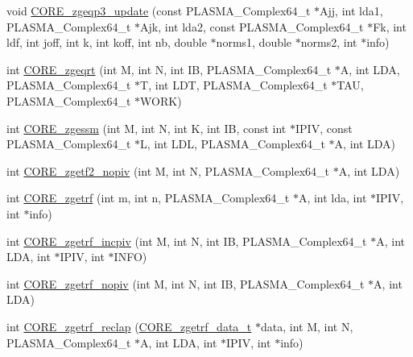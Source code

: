 \begin{DoxyCompactItemize}
\item 
void \hyperlink{group__CORE__PLASMA__Complex64__t_ga5197a279c21dd3b768492044d36b2e28_ga5197a279c21dd3b768492044d36b2e28}{C\+O\+R\+E\+\_\+zgeqp3\+\_\+update} (const P\+L\+A\+S\+M\+A\+\_\+\+Complex64\+\_\+t $\ast$Ajj, int lda1, P\+L\+A\+S\+M\+A\+\_\+\+Complex64\+\_\+t $\ast$Ajk, int lda2, const P\+L\+A\+S\+M\+A\+\_\+\+Complex64\+\_\+t $\ast$Fk, int ldf, int joff, int k, int koff, int nb, double $\ast$norms1, double $\ast$norms2, int $\ast$info)
\item 
int \hyperlink{group__CORE__PLASMA__Complex64__t_gabdb92c23fa49a35258256a0654de96fe_gabdb92c23fa49a35258256a0654de96fe}{C\+O\+R\+E\+\_\+zgeqrt} (int M, int N, int I\+B, P\+L\+A\+S\+M\+A\+\_\+\+Complex64\+\_\+t $\ast$A, int L\+D\+A, P\+L\+A\+S\+M\+A\+\_\+\+Complex64\+\_\+t $\ast$T, int L\+D\+T, P\+L\+A\+S\+M\+A\+\_\+\+Complex64\+\_\+t $\ast$T\+A\+U, P\+L\+A\+S\+M\+A\+\_\+\+Complex64\+\_\+t $\ast$W\+O\+R\+K)
\item 
int \hyperlink{group__CORE__PLASMA__Complex64__t_ga4d0ea0e6c652c958bbcd611f36b75d2e_ga4d0ea0e6c652c958bbcd611f36b75d2e}{C\+O\+R\+E\+\_\+zgessm} (int M, int N, int K, int I\+B, const int $\ast$I\+P\+I\+V, const P\+L\+A\+S\+M\+A\+\_\+\+Complex64\+\_\+t $\ast$L, int L\+D\+L, P\+L\+A\+S\+M\+A\+\_\+\+Complex64\+\_\+t $\ast$A, int L\+D\+A)
\item 
int \hyperlink{group__CORE__PLASMA__Complex64__t_ga18e3275c5c724058bcf9fe42a6cd4cfc_ga18e3275c5c724058bcf9fe42a6cd4cfc}{C\+O\+R\+E\+\_\+zgetf2\+\_\+nopiv} (int M, int N, P\+L\+A\+S\+M\+A\+\_\+\+Complex64\+\_\+t $\ast$A, int L\+D\+A)
\item 
int \hyperlink{group__CORE__PLASMA__Complex64__t_ga2478e7d46e465c84bad521f2d00b59ab_ga2478e7d46e465c84bad521f2d00b59ab}{C\+O\+R\+E\+\_\+zgetrf} (int m, int n, P\+L\+A\+S\+M\+A\+\_\+\+Complex64\+\_\+t $\ast$A, int lda, int $\ast$I\+P\+I\+V, int $\ast$info)
\item 
int \hyperlink{group__CORE__PLASMA__Complex64__t_ga2136efb038ced2ddef9251a2754612f1_ga2136efb038ced2ddef9251a2754612f1}{C\+O\+R\+E\+\_\+zgetrf\+\_\+incpiv} (int M, int N, int I\+B, P\+L\+A\+S\+M\+A\+\_\+\+Complex64\+\_\+t $\ast$A, int L\+D\+A, int $\ast$I\+P\+I\+V, int $\ast$I\+N\+F\+O)
\item 
int \hyperlink{group__CORE__PLASMA__Complex64__t_ga916150f80f14fe184b0f743c0910af80_ga916150f80f14fe184b0f743c0910af80}{C\+O\+R\+E\+\_\+zgetrf\+\_\+nopiv} (int M, int N, int I\+B, P\+L\+A\+S\+M\+A\+\_\+\+Complex64\+\_\+t $\ast$A, int L\+D\+A)
\item 
int \hyperlink{group__CORE__PLASMA__Complex64__t_ga9bfcefdb7d77fa9b55ce65fdc6ce9d8b_ga9bfcefdb7d77fa9b55ce65fdc6ce9d8b}{C\+O\+R\+E\+\_\+zgetrf\+\_\+reclap} (\hyperlink{structCORE__zgetrf__data__s}{C\+O\+R\+E\+\_\+zgetrf\+\_\+data\+\_\+t} $\ast$data, int M, int N, P\+L\+A\+S\+M\+A\+\_\+\+Complex64\+\_\+t $\ast$A, int L\+D\+A, int $\ast$I\+P\+I\+V, int $\ast$info)

\end{DoxyCompactItemize}
